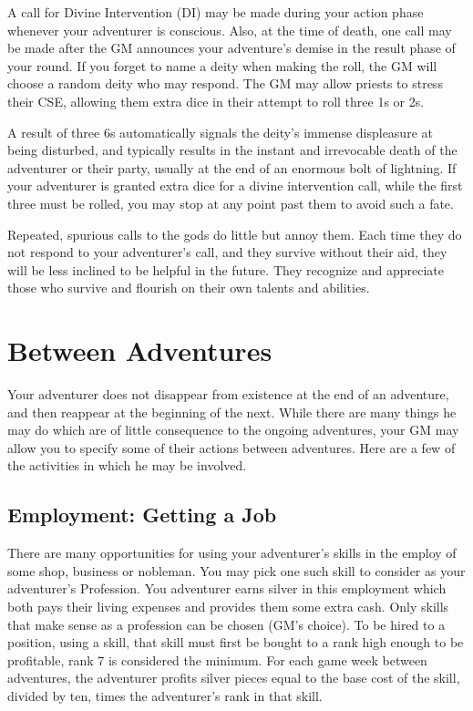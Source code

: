 A call for Divine Intervention (DI) may be made during your action phase whenever your adventurer is conscious. Also, at the time of death, one call may be made after the GM announces your adventure's demise in the result phase of your round. If you forget to name a deity when making the roll, the GM will choose a random deity who may respond. The GM may allow priests to stress their CSE, allowing them extra dice in their attempt to roll three 1s or 2s.

A result of three 6s automatically signals the deity's immense displeasure at being disturbed, and typically results in the instant and irrevocable death of the adventurer or their party, usually at the end of an enormous bolt of lightning. If your adventurer is granted extra dice for a divine intervention call, while the first three must be rolled, you may stop at any point past them to avoid such a fate.

Repeated, spurious calls to the gods do little but annoy them. Each time they do not respond to your adventurer's call, and they survive without their aid, they will be less inclined to be helpful in the future. They recognize and appreciate those who survive and flourish on their own talents and abilities.
\section{Between Adventures}

Your adventurer does not disappear from existence at the end of an adventure, and then reappear at the beginning of the next. While there are many things he may do which are of little consequence to the ongoing adventures, your GM may allow you to specify some of their actions between adventures. Here are a few of the activities in which he may be involved.
\subsection{Employment: Getting a Job}

There are many opportunities for using your adventurer's skills in the employ of some shop, business or nobleman. You may pick one such skill to consider as your adventurer's Profession. You adventurer earns silver in this employment which both pays their living expenses and provides them some extra cash. Only skills that make sense as a profession can be chosen (GM's choice). To be hired to a position, using a skill, that skill must first be bought to a rank high enough to be profitable, rank 7 is considered the minimum. For each game week between adventures, the adventurer profits silver pieces equal to the base cost of the skill, divided by ten, times the adventurer's rank in that skill.

